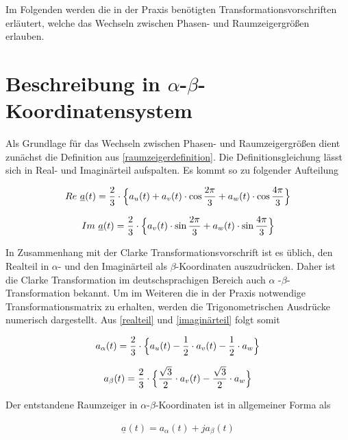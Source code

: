 Im Folgenden werden die in der Praxis benötigten Transformationsvorschriften erläutert, welche das Wechseln zwischen Phasen- und Raumzeigergrößen erlauben.


\section{Beschreibung in $\alpha$-$\beta$-Koordinatensystem}\label{sec:clark}

Als Grundlage für das Wechseln zwischen Phasen- und Raumzeigergrößen dient zunächst die Definition aus \ref{raumzeigerdefinition}. Die Definitionsgleichung lässt sich in Real- und Imaginärteil aufspalten. Es kommt so zu folgender Aufteilung

\begin{align}
	Re~{\underline{a}(t)} = \frac{2}{3} \cdot \Bigl\{ a_{u}(t) + a_{v}(t) \cdot\cos{\frac{2 \pi}{3}} + a_{w}(t) \cdot\cos{\frac{4 \pi}{3}} \Bigr\}
	\label{realteil}
\end{align}

\begin{align}
	Im~{\underline{a}(t)} = \frac{2}{3} \cdot \Bigl\{a_{v}(t)\cdot\sin{\frac{2 \pi}{3}} + a_{w}(t) \cdot\sin{\frac{4 \pi}{3}} \Bigr\}
	\label{imaginärteil}
\end{align}

In Zusammenhang mit der Clarke Transformationsvorschrift ist es üblich, den Realteil in $\alpha$- und den Imaginärteil als $\beta$-Koordinaten auszudrücken. 
Daher ist die Clarke Transformation im deutschsprachigen Bereich auch $\alpha$ -$\beta$-Transformation bekannt.
Um im Weiteren die in der Praxis notwendige Transformationsmatrix zu erhalten, werden die Trigonometrischen Ausdrücke numerisch dargestellt. 
Aus \ref{realteil} und \ref{imaginärteil} folgt somit

\begin{align}
	a_{\alpha}(t) = \frac{2}{3} \cdot \Bigl\{ a_{u}(t) - \frac{1}{2} \cdot a_{v}(t) - \frac{1}{2} \cdot a_{w}  \Bigr\}
	\label{alpha}
\end{align}

\begin{align}
	a_{\beta}(t) = \frac{2}{3} \cdot \Bigl\{\frac{\sqrt{3}}{2} \cdot a_{v}(t) - \frac{\sqrt{3}}{2} \cdot a_{w}  \Bigr\}
	\label{beta}
\end{align}

Der entstandene Raumzeiger in  $\alpha$-$\beta$-Koordinaten ist in allgemeiner Forma als 

\begin{align}
	\underline{a}(t) = a_{\alpha}(t) +j a_{\beta}(t)
	\label{raumzeigeralphabeta}
\end{align}

